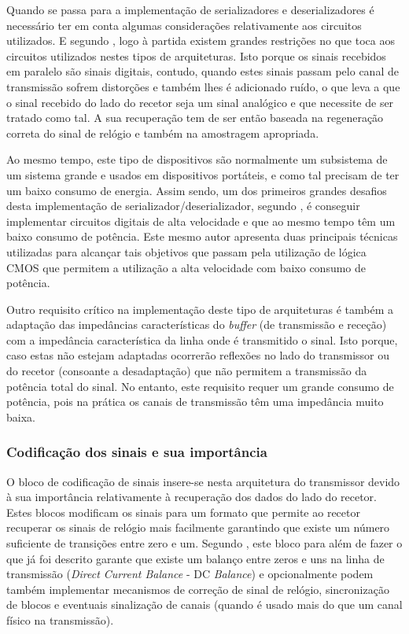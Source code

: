 Quando se passa para a implementação de serializadores e deserializadores é necessário ter em conta algumas considerações relativamente aos circuitos utilizados. E segundo \cite{R012}, logo à partida existem grandes restrições no que toca aos circuitos utilizados nestes tipos de arquiteturas. Isto porque os sinais recebidos em paralelo são sinais digitais, contudo, quando estes sinais passam pelo canal de transmissão sofrem distorções e também lhes é adicionado ruído, o que leva a que o sinal recebido do lado do recetor seja um sinal analógico e que necessite de ser tratado como tal. A sua recuperação tem de ser então baseada na regeneração correta do sinal de relógio e também na amostragem apropriada. 
	
Ao mesmo tempo, este tipo de dispositivos são normalmente um subsistema de um sistema grande e usados em dispositivos portáteis, e como tal precisam de ter um baixo consumo de energia. Assim sendo, um dos primeiros grandes desafios desta implementação de serializador/deserializador, segundo \cite{R012}, é conseguir implementar circuitos digitais de alta velocidade e que ao mesmo tempo têm um baixo consumo de potência. Este mesmo autor apresenta duas principais técnicas utilizadas para alcançar tais objetivos que passam pela utilização de lógica CMOS que permitem a utilização a alta velocidade com baixo consumo de potência. 
	
Outro requisito crítico na implementação deste tipo de arquiteturas é também a adaptação das impedâncias características do \textit{buffer} (de transmissão e receção) com a impedância característica da linha onde é transmitido o sinal. Isto porque, caso estas não estejam adaptadas ocorrerão reflexões no lado do transmissor ou do recetor (consoante a desadaptação) que não permitem a transmissão da potência total do sinal. No entanto, este requisito requer um grande consumo de potência, pois na prática os canais de transmissão têm uma impedância muito baixa. 


\subsubsection*{Codificação dos sinais e sua importância} \label{subsub:cod_impor}

O bloco de codificação de sinais insere-se nesta arquitetura do transmissor devido à sua importância relativamente à recuperação dos dados do lado do recetor. Estes blocos modificam os sinais para um formato que permite ao recetor recuperar os sinais de relógio mais facilmente garantindo que existe um número suficiente de transições entre zero e um. Segundo \cite{R032}, este bloco para além de fazer o que já foi descrito garante que existe um balanço entre zeros e uns na linha de transmissão (\textit{Direct Current Balance} - DC \textit{Balance}) e opcionalmente podem também implementar mecanismos de correção de sinal de relógio, sincronização de blocos e eventuais sinalização de canais (quando é usado mais do que um canal físico na transmissão).

